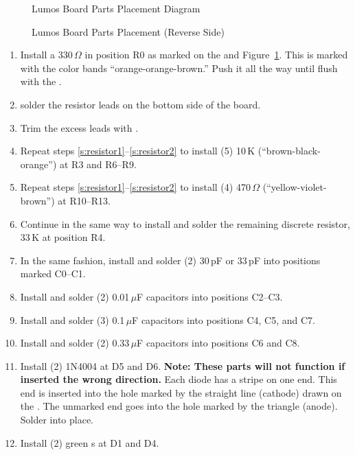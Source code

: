 \documentclass[letterpaper,twoside,onecolumn,openright,final]{memoir}
\begin{document}
\begin{figure}
\centerline{}
\caption{Lumos Board Parts Placement Diagram\label{fig:placement}}
\end{figure}
\begin{figure}
\centerline{}
\caption{Lumos Board Parts Placement (Reverse Side)\label{fig:placement-back}}
\end{figure}

\begin{enumerate}

\item\label{s:resistor1}
	Install a 330\,$\Omega$  in position R0 as marked on the 
	and Figure~\ref{fig:placement}.  This is marked with the color bands ``orange-orange-brown.'' 
	Push it all the way until flush with the .
\item	solder the resistor leads on the bottom side of the board.  
\item\label{s:resistor2}
	Trim the excess leads with .
\item	Repeat steps \ref{s:resistor1}--\ref{s:resistor2} to 
	install (5) 10\,K  (``brown-black-orange'') at R3
	and R6--R9.
\item	Repeat steps \ref{s:resistor1}--\ref{s:resistor2}
	to install (4) 470\,$\Omega$  (``yellow-violet-brown'') at R10--R13.
\item	Continue in the same way to install and solder the remaining discrete
resistor, 33\,K at position R4.
\item	In the same fashion, install and solder (2) 30\,pF or 33\,pF  into positions marked C0--C1.
\item	Install and solder (2) 0.01\,$\mu$F capacitors into positions 
	C2--C3.
\item	Install and solder (3) 0.1\,$\mu$F capacitors into positions C4, 
	C5, and C7.
\item	Install and solder (2) 0.33\,$\mu$F capacitors into positions 
	C6 and C8.
\item	Install (2) 1N4004  at D5 and D6.  
	{\bfseries Note: These parts will not function
	if inserted the wrong direction.} Each diode has
	a stripe on one end. This end is inserted into the hole marked by the straight line (cathode)
	drawn on the .  The unmarked end goes into the hole marked by the triangle
	(anode).  Solder into place. 
\item	Install (2) green s at D1 and D4.  

\end{enumerate}
\end{document}

